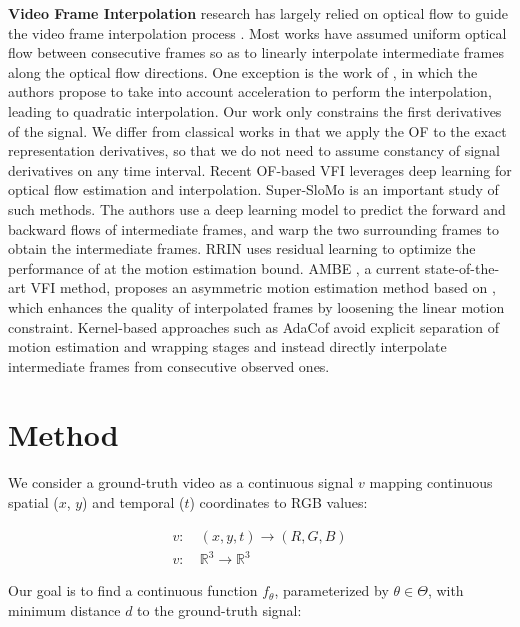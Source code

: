 \documentclass{article}
\begin{document}
\textbf{Video Frame Interpolation} research has largely relied on optical flow to guide the video frame interpolation process \cite{baker2011database} \cite{barron1994performance} \cite{herbst2009occlusion}.
Most works have assumed uniform optical flow between consecutive frames so as to linearly interpolate intermediate frames along the optical flow directions.
One exception is the work of \cite{xu2019quadratic}, in which the authors propose to take into account acceleration to perform the interpolation,
leading to quadratic interpolation.
Our work only constrains the first derivatives of the signal.
We differ from classical works in that we apply the OF to the exact representation derivatives,
so that we do not need to assume constancy of signal derivatives on any time interval.
Recent OF-based VFI leverages deep learning for optical flow estimation and interpolation.
Super-SloMo \cite{jiang2018super} is an important study of such methods.
The authors use a deep learning model to predict the forward and backward flows
of intermediate frames, and warp the two surrounding frames to obtain the intermediate frames.
RRIN \cite{li2020video} uses residual learning to optimize the performance of \cite{jiang2018super} at the motion estimation bound.
AMBE \cite{park2021asymmetric}, a current state-of-the-art VFI method,
proposes an asymmetric motion estimation method based on \cite{park2020bmbc},
which enhances the quality of interpolated frames by loosening the linear motion constraint.
Kernel-based approaches such as AdaCof \cite{lee2020adacof} avoid explicit separation of motion estimation and wrapping stages and
instead directly interpolate intermediate frames from consecutive observed ones.

\section{Method}
\label{sec_method}
We consider a ground-truth video as a continuous signal $v$ mapping continuous spatial ($x$, $y$) and temporal ($t$) coordinates to RGB values:

\begin{equation}
\begin{aligned}
v:& \: (x, y, t) \rightarrow (R, G, B) \\
v:& \: \mathbb{R}^3 \rightarrow \mathbb{R}^3
\end{aligned}
\end{equation}

Our goal is to find a continuous function $f_{\theta}$, parameterized by $\theta \in \Theta$,
with minimum distance $d$ to the ground-truth signal:
\end{document}
